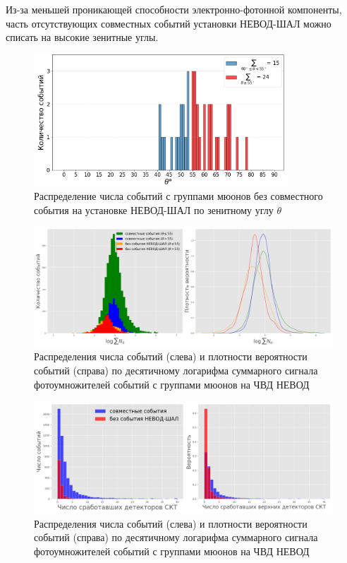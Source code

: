  Из-за меньшей проникающей способности электронно-фотонной компоненты, часть отсутствующих совместных событий установки НЕВОД-ШАЛ можно списать на высокие зенитные углы. 
 \newpage
\begin{figure}[h]
    \centering
    \includegraphics[width=0.85\textwidth]{images/not_events_by_theta.png}
    \caption{Распределение числа событий с группами мюонов без совместного события на установке НЕВОД-ШАЛ по зенитному углу \(\theta\)}
    \label{fig:not_events_by_theta}
\end{figure}
\begin{figure}[h]
    \centering
    \includegraphics[width=1\textwidth]{images/logQ_theta55.png}
    \caption{Распределения числа событий (слева) и плотности вероятности событий (справа) по десятичному логарифма суммарного сигнала фотоумножителей событий с группами мюонов на ЧВД НЕВОД}
    \label{fig:logQ_theta55}
\end{figure}
\begin{figure}[h]
    \centering
    \includegraphics[width=1\textwidth]{images/SKT.png}
    \caption{Распределения числа событий (слева) и плотности вероятности событий (справа) по десятичному логарифма суммарного сигнала фотоумножителей событий с группами мюонов на ЧВД НЕВОД}
    \label{fig:SKT.png}
\end{figure}
\newpage
 
